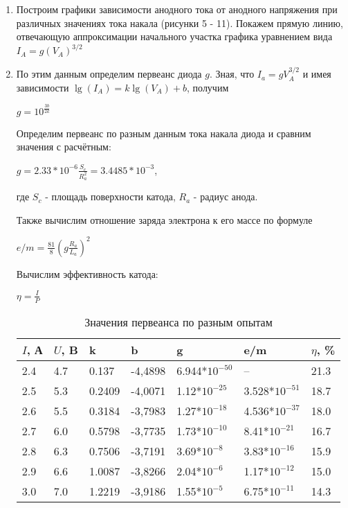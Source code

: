 \documentclass[a4paper]{article}
\begin{document}
\begin{enumerate}
\item Построим графики зависимости анодного тока от анодного напряжения при различных значениях тока накала (рисунки 5 - 11). Покажем прямую линию, отвечающую аппроксимации начального участка графика уравнением вида $I_A = g (V_A)^{3/2}$



\item По этим данным определим первеанс диода $g$. Зная, что $I_a = gV_A^{3/2}$ и имея зависимости $\lg(I_A) = k \lg(V_A) + b$, получим
\begin{center}
    $g = 10^{\frac{3b}{2k}}$
\end{center}

Определим первеанс по разным данным тока накала диода и сравним значения с расчётным:

\begin{center}
    $g = 2.33*10^{-6} \frac{S_c}{R_a ^2} = 3.4485*10^{-3}$,
\end{center}
где $S_c$ - площадь поверхности катода, $R_a$ - радиус анода. \par

Также вычислим отношение заряда электрона к его массе по формуле

\begin{center}
   $e/m = \frac{81}{8}(g\frac{R_a}{L_a})^2$
\end{center}

Вычислим эффективность катода:
\begin{center}
    $\eta = \frac{I}{P}$
\end{center}

    \begin{table}[h]
    \centering
    \begin{center}
    \caption{Значения первеанса по разным опытам}
    \end{center}
    \vspace{0.1cm}
    \label{tab:my_label}
    \begin{tabular}{ |p{1cm}|p{1cm}|p{1cm}|p{2cm}|p{2cm}|p{2cm}|p{2cm}|}
 \hline
 $I$, А & $U$, B & k & b & g & e/m & $\eta$, \% \\
 \hline
2.4 & 4.7 & 0.137 & -4,4898 & 6.944*$10^{-50}$ & -- & 21.3\\
 \hline
2.5 & 5.3 & 0.2409 & -4,0071 & 1.12*$10^{-25}$ & 3.528*$10^{-51}$ & 18.7\\
 \hline
2.6 & 5.5 & 0.3184 & -3,7983 & 1.27*$10^{-18}$ & 4.536*$10^{-37}$ & 18.0\\
 \hline
2.7 & 6.0 & 0.5798 & -3,7735 & 1.73*$10^{-10}$ & 8.41*$10^{-21}$ & 16.7\\
 \hline
2.8 & 6.3 & 0.7506 & -3,7191 & 3.69*$10^{-8}$ & 3.83*$10^{-16}$ & 15.9 \\
 \hline
2.9 & 6.6 & 1.0087 & -3,8266 & 2.04*$10^{-6}$ & 1.17*$10^{-12}$ & 15.0\\
 \hline
3.0 & 7.0 & 1.2219 & -3,9186 & 1.55*$10^{-5}$ & 6.75*$10^{-11}$ & 14.3\\
 \hline 
\end{tabular}
\end{table}


\end{enumerate}
\end{document}
